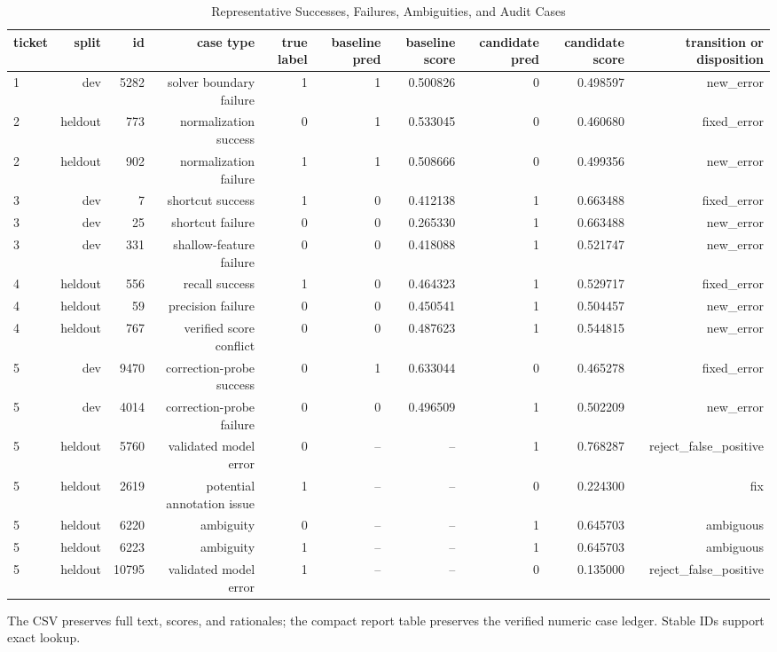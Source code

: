 \begin{table}[t]
\centering
\caption{Representative Successes, Failures, Ambiguities, and Audit Cases}
\label{tab:cases}
\begin{adjustbox}{max width=\textwidth}
\scriptsize
\begin{tabular}{lrrrrrrrrr}
\hline
ticket & split & id & case type & true label & baseline pred & baseline score & candidate pred & candidate score & transition or disposition \\
\hline
1 & dev & 5282 & solver boundary failure & 1 & 1 & 0.500826 & 0 & 0.498597 & new\_error \\
2 & heldout & 773 & normalization success & 0 & 1 & 0.533045 & 0 & 0.460680 & fixed\_error \\
2 & heldout & 902 & normalization failure & 1 & 1 & 0.508666 & 0 & 0.499356 & new\_error \\
3 & dev & 7 & shortcut success & 1 & 0 & 0.412138 & 1 & 0.663488 & fixed\_error \\
3 & dev & 25 & shortcut failure & 0 & 0 & 0.265330 & 1 & 0.663488 & new\_error \\
3 & dev & 331 & shallow-feature failure & 0 & 0 & 0.418088 & 1 & 0.521747 & new\_error \\
4 & heldout & 556 & recall success & 1 & 0 & 0.464323 & 1 & 0.529717 & fixed\_error \\
4 & heldout & 59 & precision failure & 0 & 0 & 0.450541 & 1 & 0.504457 & new\_error \\
4 & heldout & 767 & verified score conflict & 0 & 0 & 0.487623 & 1 & 0.544815 & new\_error \\
5 & dev & 9470 & correction-probe success & 0 & 1 & 0.633044 & 0 & 0.465278 & fixed\_error \\
5 & dev & 4014 & correction-probe failure & 0 & 0 & 0.496509 & 1 & 0.502209 & new\_error \\
5 & heldout & 5760 & validated model error & 0 & -- & -- & 1 & 0.768287 & reject\_false\_positive \\
5 & heldout & 2619 & potential annotation issue & 1 & -- & -- & 0 & 0.224300 & fix \\
5 & heldout & 6220 & ambiguity & 0 & -- & -- & 1 & 0.645703 & ambiguous \\
5 & heldout & 6223 & ambiguity & 1 & -- & -- & 1 & 0.645703 & ambiguous \\
5 & heldout & 10795 & validated model error & 1 & -- & -- & 0 & 0.135000 & reject\_false\_positive \\
\hline
\end{tabular}
\end{adjustbox}
\par\footnotesize{The CSV preserves full text, scores, and rationales; the compact report table preserves the verified numeric case ledger. Stable IDs support exact lookup.}
\end{table}
